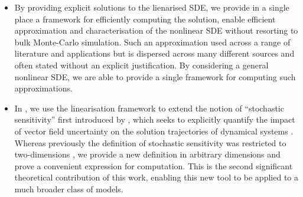 \begin{itemize}
\begin{itemize}
		      \item By providing explicit solutions to the lienarised SDE, we provide in a single place a framework for efficiently computing the solution, enable efficient approximation and characterisation of the nonlinear SDE without resorting to bulk Monte-Carlo simulation.
		            Such an approximation used across a range of literature and applications \citep{Jazwinski_2014_StochasticProcessesFiltering,SarkkaSolin_2019_AppliedStochasticDifferential,KaszasHaller_2020_UniversalUpperEstimate,ArchambeauEtAl_2007_GaussianProcessApproximations,Sanz-AlonsoStuart_2017_GaussianApproximationsSmall,LawEtAl_2015_DataAssimilationMathematical,ReichCotter_2015_ProbabilisticForecastingBayesian,BudhirajaEtAl_2019_AssimilatingDataModels} but is dispersed across many different sources and often stated without an explicit justification.
		            By considering a general nonlinear SDE, we are able to provide a single framework for computing such approximations.


		      \item In , we use the linearisation framework to extend the notion of ``stochastic sensitivity'' first introduced by \citet{Balasuriya_2020_StochasticSensitivityComputable}, which seeks to explicitly quantify the impact of vector field uncertainty on the solution trajectories of dynamical systems \citep{BranickiUda_2021_LagrangianUncertaintyQuantification,KaszasHaller_2020_UniversalUpperEstimate,BranickiUda_2023_PathBasedDivergenceRates,Balibrea-IniestaEtAl_2016_LagrangianDescriptorsStochastic}.
		            Whereas previously the definition of stochastic sensitivity was restricted to two-dimensions \citep{Balasuriya_2020_StochasticSensitivityComputable}, we provide a new definition in arbitrary dimensions and prove a convenient expression for computation.
		            This is the second significant theoretical contribution of this work, enabling this new tool to be applied to a much broader class of models.


\end{itemize}
\end{itemize}
